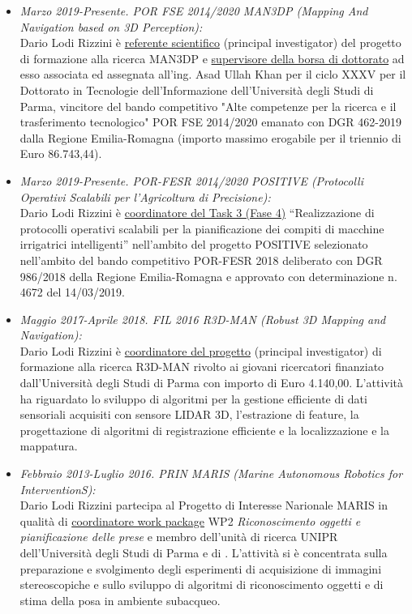 \documentclass[11pt]{article}
\newcommand{\ITEMDATE}[1]{\item \textit{#1:}\\}
\begin{document}
\begin{itemize}

\ITEMDATE{Marzo 2019-Presente. POR FSE 2014/2020 MAN3DP (Mapping And Navigation based on 3D Perception)}
Dario Lodi Rizzini \`e \ul{referente scientifico} (principal investigator) del progetto di formazione alla ricerca MAN3DP
e \ul{supervisore della borsa di dottorato} ad esso associata ed assegnata all'ing. Asad Ullah Khan per il ciclo
XXXV per il Dottorato in Tecnologie dell'Informazione dell'Universit\`a degli Studi di Parma,
vincitore del bando competitivo "Alte competenze per la ricerca e il trasferimento tecnologico"
POR FSE 2014/2020 emanato con DGR 462-2019 dalla Regione Emilia-Romagna (importo
massimo erogabile per il triennio di Euro 86.743,44). 

\ITEMDATE{Marzo 2019-Presente. POR-FESR 2014/2020 POSITIVE (Protocolli Operativi Scalabili per l'Agricoltura di Precisione)}
Dario Lodi Rizzini \`e \ul{coordinatore del Task 3 (Fase 4)} ``Realizzazione di protocolli operativi scalabili per la
pianificazione dei compiti di macchine irrigatrici intelligenti'' nell'ambito del progetto POSITIVE
selezionato nell'ambito del bando competitivo POR-FESR 2018 deliberato con DGR 986/2018 della Regione Emilia-Romagna e
approvato con determinazione n. 4672 del 14/03/2019.

\ITEMDATE{Maggio 2017-Aprile 2018.  FIL 2016 R3D-MAN (Robust 3D Mapping and Navigation)}
Dario Lodi Rizzini \`e \ul{coordinatore del progetto} (principal investigator) di formazione alla ricerca R3D-MAN rivolto ai giovani 
ricercatori finanziato dall'Universit\`a degli Studi di Parma con importo di Euro 4.140,00. 
L'attivit\`a ha riguardato lo sviluppo di algoritmi per la gestione efficiente di dati sensoriali 
acquisiti con sensore LIDAR 3D, l'estrazione di feature, la progettazione di algoritmi di registrazione 
efficiente e la localizzazione e la mappatura. 

\ITEMDATE{Febbraio 2013-Luglio 2016. PRIN MARIS (Marine Autonomous Robotics for InterventionS)} 
Dario Lodi Rizzini partecipa al Progetto di Interesse Narionale MARIS in qualit\`a di 
\ul{coordinatore work package} WP2 \emph{Riconoscimento oggetti e pianificazione delle prese}
e membro dell'unit\`a di ricerca UNIPR dell'Universit\`a degli Studi di Parma e di . 
L'attivit\`a si \`e concentrata sulla preparazione e svolgimento degli esperimenti
di acquisizione di immagini stereoscopiche e sullo sviluppo di algoritmi di riconoscimento 
oggetti e di stima della posa in ambiente subacqueo.

\end{itemize}
\end{document}
